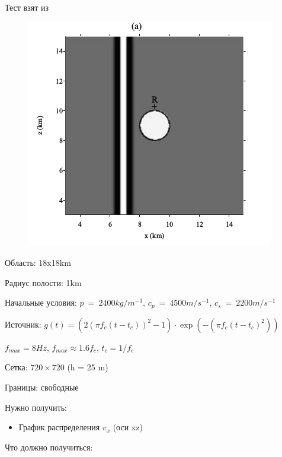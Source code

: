 \documentclass{article}
\begin{document}
Тест взят из \cite{free_and_smooth}

\begin{figure}
  \begin{center}
    \includegraphics[scale=0.5]{2D_seismic_tests/4.png}
  \end{center}
\end{figure}

Область: 18x18km

Радиус полости: 1km

Начальные условия: $p~=~2400 kg/m^{-3}$, $c_p~=~4500 m/s^{-1}$, $c_s~=~2200 m/s^{-1}$

Источник: $ g(t) = \left( 2 ( \pi f_c(t - t_c) )^2 - 1 \right) \cdot \exp\left( -\left( \pi f_c(t - t_c)^2 \right) \right)$

$f_{max} = 8 Hz$, $f_{max} \approx 1.6 f_c$, $t_c = 1/f_c$

Сетка: $720\times720$ (h = 25 m)

Границы: свободные

Нужно получить: 

\begin{itemize}
    \item График распределения $v_x$ (оси xz)
\end{itemize}

Что должно получиться:
\end{document}
